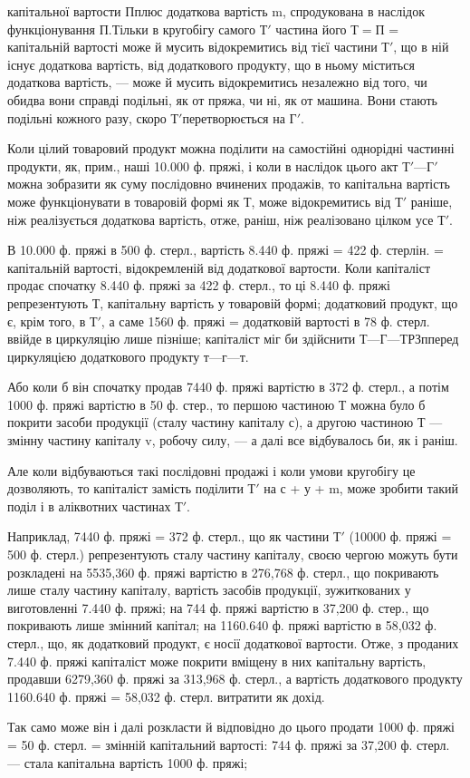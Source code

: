 \parcont{}  %
капітальної вартости $П п$люс додаткова вартість m, спродукована в
наслідок функціонування $П.

Т$ільки в кругобігу самого $Т'$ частина його $Т = П$ = капітальній вартості
може й мусить відокремитись від тієї частини $Т'$, що в ній існує додаткова
вартість, від додаткового продукту, що в ньому міститься додаткова
вартість, — може й мусить відокремитись незалежно від того, чи обидва
вони справді подільні, як от пряжа, чи ні, як от машина. Вони стають
подільні кожного разу, скоро $Т' п$еретворюється на $Г'$.

Коли цілий товаровий продукт можна поділити на самостійні однорідні
частинні продукти, як, прим., наші 10.000 ф. пряжі, і коли в
наслідок цього акт $Т' — Г'$ можна зобразити як суму послідовно вчинених
продажів, то капітальна вартість може функціонувати в товаровій
формі як Т, може відокремитись від $Т'$ раніше, ніж реалізується додаткова
вартість, отже, раніш, ніж реалізовано цілком усе $Т'$.

В 10.000 ф. пряжі в 500 ф. стерл., вартість 8.440 ф. пряжі = 422 ф.
стерлін. = капітальній вартості, відокремленій від додаткової вартости.
Коли капіталіст продає спочатку 8.440 ф. пряжі за 422 ф. стерл., то
ці 8.440 ф. пряжі репрезентують Т, капітальну вартість у товаровій
формі; додатковий продукт, що є, крім того, в $Т'$, а саме 1560 ф.
пряжі = додатковій вартості в 78 ф. стерл. ввійде в циркуляцію лише
пізніше; капіталіст міг би здійснити $Т — Г — Т Р Зп п$еред циркуляцією
додаткового продукту $т — г — т$.

Або коли б він спочатку продав 7440 ф. пряжі вартістю в 372 ф.
стерл., а потім 1000 ф. пряжі вартістю в 50 ф. стер., то першою частиною
Т можна було б покрити засоби продукції (сталу частину капіталу
с), а другою частиною Т — змінну частину капіталу v, робочу
силу, — а далі все відбувалось би, як і раніш.

Але коли відбуваються такі послідовні продажі і коли умови кругобігу
це дозволяють, то капіталіст замість поділити $Т'$ на с + у + m,
може зробити такий поділ і в аліквотних частинах $Т'$.

Наприклад, 7440 ф. пряжі = 372 ф. стерл., що як частини $Т'$
(10000 ф. пряжі = 500 ф. стерл.) репрезентують сталу частину капіталу,
своєю чергою можуть бути розкладені на 5535,360 ф. пряжі вартістю
в 276,768 ф. стерл., що покривають лише сталу частину капіталу, вартість
засобів продукції, зужиткованих у виготовленні 7.440 ф. пряжі; на 744 ф. пряжі
вартістю в 37,200 ф. стер., що покривають лише змінний капітал; на
1160.640 ф. пряжі вартістю в 58,032 ф. стерл., що, як додатковий продукт,
є носії додаткової вартости. Отже, з проданих 7.440 ф. пряжі
капіталіст може покрити вміщену в них капітальну вартість, продавши
6279,360 ф. пряжі за 313,968 ф. стерл., а вартість додаткового продукту
1160.640 ф. пряжі = 58,032 ф. стерл. витратити як дохід.

Так само може він і далі розкласти й відповідно до цього продати
1000 ф. пряжі = 50 ф. стерл. = змінній капітальний вартості: 744 ф.
пряжі за 37,200 ф. стерл. — стала капітальна вартість 1000 ф. пряжі;
\parbreak{}  %
